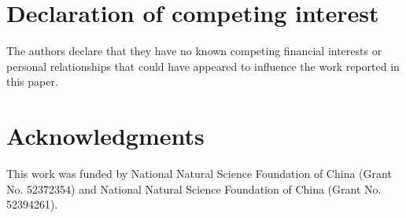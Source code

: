 \documentclass[preprint,12pt,authoryear]{elsarticle}
\begin{document}
\section*{Declaration of competing interest}
The authors declare that they have no known competing financial interests or personal relationships that could have appeared to 
influence the work reported in this paper.


\section*{Acknowledgments}
This work was funded by National Natural Science Foundation of China (Grant No. 52372354) and National Natural Science Foundation of China (Grant No. 52394261).



 

\end{document}
